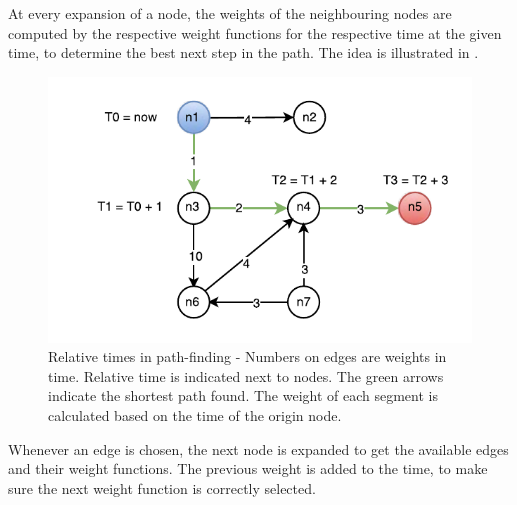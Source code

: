 At every expansion of a node, the weights of the neighbouring nodes are computed by the respective weight functions for the respective time at the given time, to determine the best next step in the path. The idea is illustrated in .
\begin{figure}[h]
\centering
\includegraphics[width=\linewidth]{figures/timed-graph}
\caption{Relative times in path-finding - Numbers on edges are weights in time. Relative time is indicated next to nodes. The green arrows indicate the shortest path found. The weight of each segment is calculated based on the time of the origin node.}
\label{fig:timed-graph}
\end{figure}

Whenever an edge is chosen, the next node is expanded to get the available edges and their weight functions. The previous weight is added to the time, to make sure the next weight function is correctly selected.




